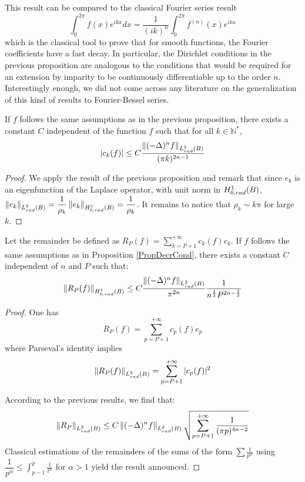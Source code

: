 \documentclass[11pt,a4paper]{article}
\begin{document}
\begin{Rem}
This result can be compared to the classical Fourier series result \[\int_{0}^{2\pi}f(x) e^{ikx}dx = \dfrac{1}{(ik)^n}\int_{0}^{2\pi} f^{(n)}(x) e^{ikx}\]
which is the classical tool to prove that for smooth functions, the Fourier coefficients have a fast decay. In particular, the Dirichlet conditions in the previous proposition are analogous to the conditions that would be required for an extension by imparity  to be continuously differentiable up to the order $n$. Interestingly enough, we did not come across any literature on the generalization of this kind of results to Fourier-Bessel series. 
\end{Rem}

\begin{Cor} If $f$ follows the same assumptions as in the previous proposition, there exists a constant $C$ independent of the function $f$ such that for all $k \in \mathbb{N^*}$, 
\[ |c_k(f)| \leq  C \dfrac{\left\|(-\Delta)^n f\right\|_{L^2_{rad}(B)}}{(\pi k)^{2n-1}}\] 
\end{Cor}
\begin{proof}
We apply the result of the previous proposition and remark that since $e_k$ is an eigenfunction of the Laplace operator, with unit norm in $H^1_{0,rad}(B)$, $\left\|e_k\right\|_{L^2_{rad}(B)} = \dfrac{1}{\rho_k}\left\|e_k\right\|_{H^1_{0,rad}(B)} = \dfrac{1}{\rho_k}$. It remains to notice that $\rho_{k} \sim k\pi$ for large $k$.
\end{proof}

\begin{Cor} Let the remainder be defined as $R_P(f) = \displaystyle\sum_{k = P+1}^{+\infty} c_{k}(f) e_{k}$. If $f$ follows the same assumptions as in Proposition \ref{PropDecrCond}, there exists a constant $C$ independent of $n$ and $P$ such that: 
\[\left\|R_P(f)\right\|_{H^1_{0,rad}(B)} \leq C\dfrac{\left\|(-\Delta)^n f\right\|_{L^2_{rad}(B)}}{\pi^{2n}}\dfrac{1}{n^{\frac{1}{2}}P^{2n-\frac{3}{2}}}\]
\label{EstimationRest}

\begin{proof}
One has 
\[R_P(f) = \sum_{p=P+1}^{+\infty}c_p(f) e_p\]
where Parseval's identity implies
\[\left\|R_P(f)\right\|_{L^2_{rad}(B)} = \sum_{p=P+1}^{+\infty}|c_p(f)|^2\]

According to the previous results, we find that:
\[\left\|R_P\right\|_{L^2_{rad}(B)} \leq C \left\|(-\Delta)^n f\right\|_{L^2_{rad}(B)}\sqrt{\sum_{p= P+1}^{+\infty} \dfrac{1}{(\pi p)^{4n-2}}} \]
Classical estimations of the remainders of the sums of the form $\sum \frac{1}{p^{\alpha}}$ using $\dfrac{1}{p^{\alpha}} \leq \displaystyle\int_{p-1}^{p} \frac{1}{t^\alpha}$ for $\alpha >1$  yield the result announced. 

\end{proof}

\end{Cor}
\end{document}

